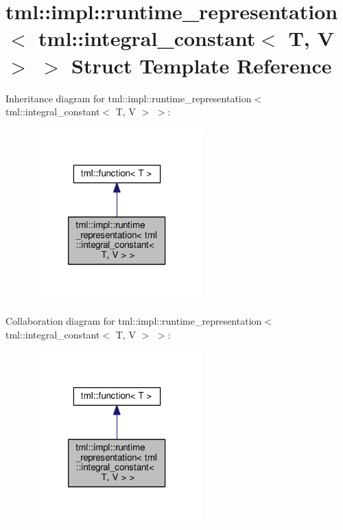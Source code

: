 \hypertarget{structtml_1_1impl_1_1runtime__representation_3_01tml_1_1integral__constant_3_01_t_00_01_v_01_4_01_4}{\section{tml\+:\+:impl\+:\+:runtime\+\_\+representation$<$ tml\+:\+:integral\+\_\+constant$<$ T, V $>$ $>$ Struct Template Reference}
\label{structtml_1_1impl_1_1runtime__representation_3_01tml_1_1integral__constant_3_01_t_00_01_v_01_4_01_4}
}


Inheritance diagram for tml\+:\+:impl\+:\+:runtime\+\_\+representation$<$ tml\+:\+:integral\+\_\+constant$<$ T, V $>$ $>$\+:
\nopagebreak
\begin{figure}[H]
\begin{center}
\leavevmode
\includegraphics[width=184pt]{structtml_1_1impl_1_1runtime__representation_3_01tml_1_1integral__constant_3_01_t_00_01_v_01_4_01_4__inherit__graph}
\end{center}
\end{figure}


Collaboration diagram for tml\+:\+:impl\+:\+:runtime\+\_\+representation$<$ tml\+:\+:integral\+\_\+constant$<$ T, V $>$ $>$\+:
\nopagebreak
\begin{figure}[H]
\begin{center}
\leavevmode
\includegraphics[width=184pt]{structtml_1_1impl_1_1runtime__representation_3_01tml_1_1integral__constant_3_01_t_00_01_v_01_4_01_4__coll__graph}
\end{center}
\end{figure}
